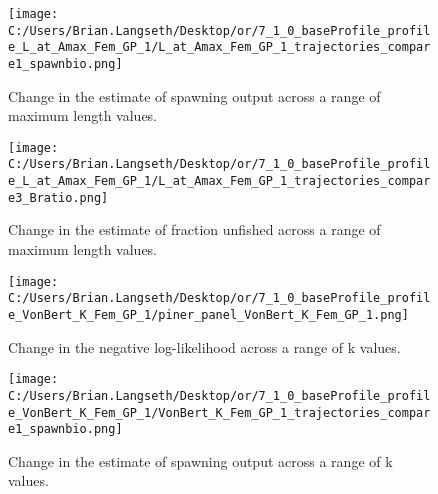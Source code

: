 \documentclass[11pt,
  english,
  a4paper,
]{article}
\begin{document}
\tagmcend\tagstructend


\begin{figure}
\centering
\texttt{[image: C:/Users/Brian.Langseth/Desktop/or/7\_1\_0\_baseProfile\_profile\_L\_at\_Amax\_Fem\_GP\_1/L\_at\_Amax\_Fem\_GP\_1\_trajectories\_compare1\_spawnbio.png]}
\caption{Change in the estimate of spawning output across a range of maximum length values.\label{fig:linf-ssb}}
\end{figure}

\tagmcend\tagstructend


\begin{figure}
\centering
\texttt{[image: C:/Users/Brian.Langseth/Desktop/or/7\_1\_0\_baseProfile\_profile\_L\_at\_Amax\_Fem\_GP\_1/L\_at\_Amax\_Fem\_GP\_1\_trajectories\_compare3\_Bratio.png]}
\caption{Change in the estimate of fraction unfished across a range of maximum length values.\label{fig:linf-depl}}
\end{figure}

\tagmcend\tagstructend


\begin{figure}
\centering
\texttt{[image: C:/Users/Brian.Langseth/Desktop/or/7\_1\_0\_baseProfile\_profile\_VonBert\_K\_Fem\_GP\_1/piner\_panel\_VonBert\_K\_Fem\_GP\_1.png]}
\caption{Change in the negative log-likelihood across a range of k values.\label{fig:k-profile}}
\end{figure}

\tagmcend\tagstructend


\begin{figure}
\centering
\texttt{[image: C:/Users/Brian.Langseth/Desktop/or/7\_1\_0\_baseProfile\_profile\_VonBert\_K\_Fem\_GP\_1/VonBert\_K\_Fem\_GP\_1\_trajectories\_compare1\_spawnbio.png]}
\caption{Change in the estimate of spawning output across a range of k values.\label{fig:k-ssb}}
\end{figure}
\end{document}
